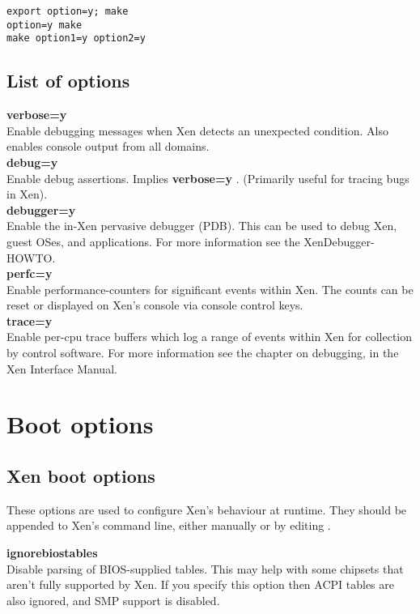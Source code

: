 \documentclass[11pt,twoside,final,openright]{xenstyle}
\begin{document}
{\begin{verbatim}
export option=y; make
option=y make
make option1=y option2=y
\end{verbatim}

\section{List of options}

{\bf verbose=y }\\
Enable debugging messages when Xen detects an unexpected condition.
Also enables console output from all domains. \\
{\bf debug=y }\\
Enable debug assertions.  Implies {\bf verbose=y }.
(Primarily useful for tracing bugs in Xen).        \\
{\bf debugger=y }\\
Enable the in-Xen pervasive debugger (PDB).
This can be used to debug Xen, guest OSes, and
applications. For more information see the 
XenDebugger-HOWTO.                                 \\
{\bf perfc=y }\\
Enable performance-counters for significant events
within Xen. The counts can be reset or displayed
on Xen's console via console control keys.          \\
{\bf trace=y }\\
Enable per-cpu trace buffers which log a range of
events within Xen for collection by control
software.  For more information see the chapter on debugging,
in the Xen Interface Manual.

\chapter{Boot options}

\section{Xen boot options}

These options are used to configure Xen's behaviour at runtime.  They
should be appended to Xen's command line, either manually or by
editing .

{\bf ignorebiostables }\\
 Disable parsing of BIOS-supplied tables. This may help with some
 chipsets that aren't fully supported by Xen. If you specify this
 option then ACPI tables are also ignored, and SMP support is
 disabled. \\

}
\end{document}
